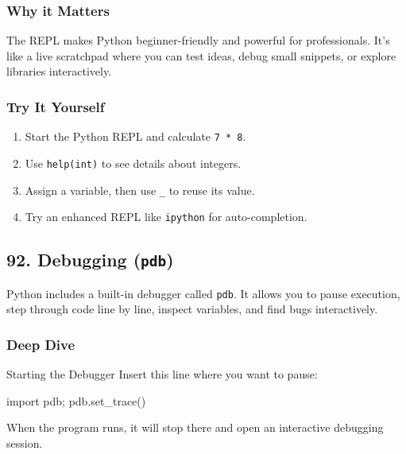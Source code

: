 \documentclass[
  letterpaper,
  DIV=11,
  numbers=noendperiod]{scrreprt}
\newenvironment{Shaded}{\begin{snugshade}}{\end{snugshade}}
\newcommand{\ImportTok}[1]{\textcolor[rgb]{0.00,0.46,0.62}{#1}}
\newcommand{\NormalTok}[1]{\textcolor[rgb]{0.00,0.23,0.31}{#1}}
\newcommand{\OperatorTok}[1]{\textcolor[rgb]{0.37,0.37,0.37}{#1}}
\providecommand{\tightlist}{%
  \setlength{\itemsep}{0pt}\setlength{\parskip}{0pt}}
\begin{document}
\subsubsection{Why it Matters}\label{why-it-matters-90}

The REPL makes Python beginner-friendly and powerful for professionals.
It's like a live scratchpad where you can test ideas, debug small
snippets, or explore libraries interactively.

\subsubsection{Try It Yourself}\label{try-it-yourself-90}

\begin{enumerate}
\def\labelenumi{\arabic{enumi}.}
\tightlist
\item
  Start the Python REPL and calculate \texttt{7\ *\ 8}.
\item
  Use \texttt{help(int)} to see details about integers.
\item
  Assign a variable, then use \texttt{\_} to reuse its value.
\item
  Try an enhanced REPL like \texttt{ipython} for auto-completion.
\end{enumerate}

\subsection{\texorpdfstring{92. Debugging
(\texttt{pdb})}{92. Debugging (pdb)}}\label{debugging-pdb}

Python includes a built-in debugger called \texttt{pdb}. It allows you
to pause execution, step through code line by line, inspect variables,
and find bugs interactively.

\subsubsection{Deep Dive}\label{deep-dive-91}

Starting the Debugger Insert this line where you want to pause:

\begin{Shaded}
\begin{Highlighting}[]
\ImportTok{import}\NormalTok{ pdb}\OperatorTok{;}\NormalTok{ pdb.set\_trace()}
\end{Highlighting}
\end{Shaded}

When the program runs, it will stop there and open an interactive
debugging session.
\end{document}
